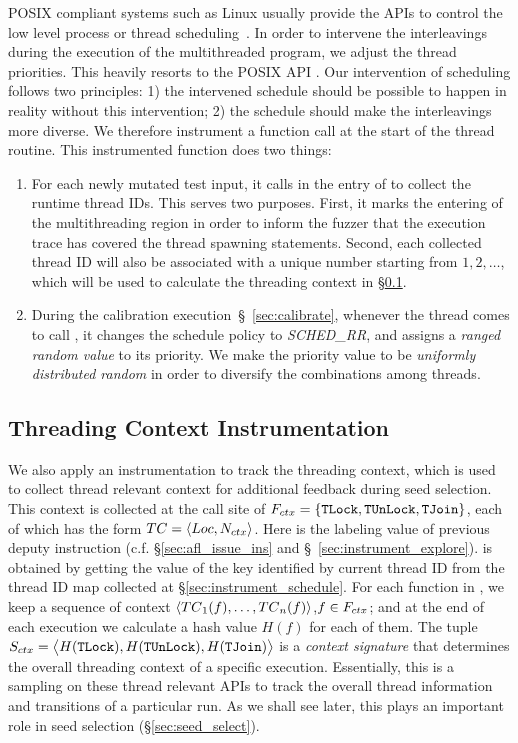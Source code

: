 POSIX compliant systems such as Linux
usually provide the APIs to control the low level process or thread scheduling~\cite{posixstd,tlpi}.
In order to intervene the interleavings during the execution of the multithreaded program, we adjust the thread priorities.
This heavily resorts to the POSIX API . Our intervention of scheduling follows two principles: 1) the intervened schedule should be possible to happen in reality without this intervention; 2) the schedule should make the interleavings more diverse. We therefore instrument a function call \rtifunc at the start of the thread routine. This instrumented function does two things:
\begin{enumerate}[(1)]
    \item For each newly mutated test input, it calls  in the entry of \FSStart to collect the runtime thread IDs. This serves two purposes.
    First, it marks the entering of the multithreading region in order to inform the fuzzer that the execution trace has covered the thread spawning statements.
    Second, each collected thread ID will also be associated with a unique number \ntid starting from $1,2,\ldots$, which will be used to calculate the threading context in \S\ref{sec:instrument_thread_ctx}.
    \item During the calibration execution~\S~\ref{sec:calibrate}, whenever the thread comes to call \rtifunc, it changes the schedule policy to \emph{SCHED\_RR}, and assigns a \emph{ranged random value} to its priority.
    We make the priority value to be \emph{uniformly distributed random} in order to diversify the combinations among threads.
\end{enumerate}

\subsection{Threading Context Instrumentation}\label{sec:instrument_thread_ctx}
We also apply an instrumentation to track the threading context, which is used to collect thread relevant context for additional feedback during seed selection.
This context is collected at the call site of $F_{ctx}=\{\texttt{TLock}, \texttt{TUnLock}, \texttt{TJoin}\}$, each of which has the form $TC=\langle Loc, N_{ctx}\rangle$. Here \iloc is the labeling value of previous deputy instruction (c.f. \S\ref{sec:afl_issue_ins} and \S~\ref{sec:instrument_explore}). \ntid is obtained by getting the value of the key identified by current thread ID from the thread ID map collected at \S\ref{sec:instrument_schedule}. For each function in \FSThread, we keep a sequence of context $\langle TC{_1}(f),\ldots,TC{_n}(f)\rangle$,$f\in F_{ctx}$; and at the end of each execution we calculate a hash value $H(f)$ for each of them. The tuple ${S}_{ctx}=\big\langle H(\texttt{TLock}),H(\texttt{TUnLock}),H(\texttt{TJoin})\big\rangle$ is a \emph{context signature} that determines the overall threading context of a specific execution. Essentially, this is a sampling on these thread relevant APIs to track the overall thread information and transitions of a particular run. As we shall see later, this plays an important role in seed selection (\S\ref{sec:seed_select}).


